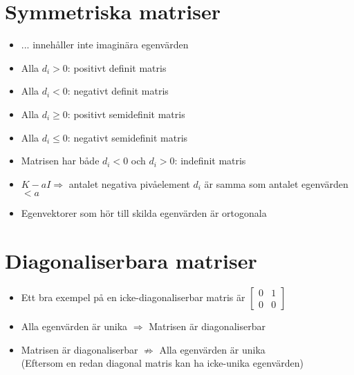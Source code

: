 \documentclass[a4paper,11pt]{article}
\begin{document}
\section{Symmetriska matriser}
\begin{itemize}
\item
  ... innehåller inte imaginära egenvärden
\item Alla $d_i>0$: positivt definit matris
\item Alla $d_i<0$: negativt definit matris
\item Alla $d_i\geq0$: positivt semidefinit matris
\item Alla $d_i\leq0$: negativt semidefinit matris
\item Matrisen har både $d_i<0$ och $d_i>0$: indefinit matris
\item
  $K-aI \Rightarrow$ antalet negativa pivåelement $d_i$ är samma som antalet egenvärden $< a$
\item
  Egenvektorer som hör till skilda egenvärden är ortogonala
\end{itemize}

\section{Diagonaliserbara matriser}
\begin{itemize}
\item
  Ett bra exempel på en icke-diagonaliserbar matris är
  $\begin{bmatrix}
    0 & 1 \\
    0 & 0
  \end{bmatrix}$
\item
  Alla egenvärden är unika $\Rightarrow$ Matrisen är diagonaliserbar
\item
  Matrisen är diagonaliserbar $\nRightarrow$ Alla egenvärden är unika \\
  (Eftersom en redan diagonal matris kan ha icke-unika egenvärden)  
\end{itemize}
\end{document}
